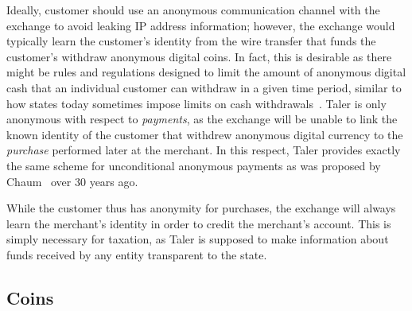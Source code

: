 \documentclass{llncs}
\begin{document}
Ideally, customer should use an anonymous communication channel with
the exchange to avoid leaking IP address information; however, the exchange
would typically learn the customer's identity from the wire transfer
that funds the customer's withdraw anonymous digital coins.
In fact, this is desirable as there might be rules and regulations
designed to limit the amount of anonymous digital cash that an
individual customer can withdraw in a given time period, similar to
how states today sometimes impose limits on cash
withdrawals~\cite{france2015cash,greece2015cash}.
Taler is only anonymous with respect to {\em payments}, as the exchange
will be unable to link the known identity of the customer that withdrew
anonymous digital currency to the {\em purchase} performed later at the
merchant.  In this respect, Taler provides exactly the same scheme for
unconditional anonymous payments as was proposed by
Chaum~\cite{chaum1983blind,chaum1990untraceable} over 30 years ago.

While the customer thus has anonymity for purchases, the exchange will
always learn the merchant's identity in order to credit the merchant's
account.  This is simply necessary for taxation, as Taler is supposed
to make information about funds received by any entity transparent
to the state.



\subsection{Coins}
\end{document}
